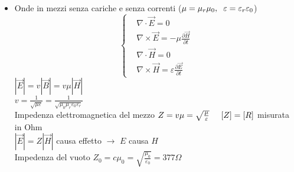 \documentclass[a4paper]{article}
\begin{document}
\begin{itemize}
\item Onde in mezzi senza cariche e senza correnti ($\mu=\mu_r \mu_0,\hspace{2mm} \varepsilon = \varepsilon_r \varepsilon_0$)
	\begin{equation*}
	\begin{cases}
		& \nabla \cdot \overrightarrow{E}=0\\
		& \nabla \times \overrightarrow{E}=-\mu\frac{\partial \overrightarrow{H}}{\partial t}\\
		& \nabla \cdot \overrightarrow{H} = 0\\
		& \nabla \times \overrightarrow{H} =\varepsilon\frac{\partial \overrightarrow{E}}{\partial t}
	\end{cases}
	\end{equation*} 
$|\overrightarrow{E}|=v|\overrightarrow{B}|=v \mu|\overrightarrow{H}|$\\
$v=\frac{1}{\sqrt{\mu \varepsilon}}=\frac{1}{\sqrt{\mu_0 \mu_r \varepsilon_0 \varepsilon_r}}$\\

Impedenza elettromagnetica del mezzo $Z=v \mu = \sqrt{\frac{\mu}{\varepsilon}}\hspace{5mm} [Z]=[R]$ misurata in Ohm\\
$|\overrightarrow{E}|=Z|\overrightarrow{H}|$ causa effetto $\rightarrow$ $E$ causa $H$\\
Impedenza del vuoto $Z_0=c\mu_0=\sqrt{\frac{\mu_0}{\varepsilon_0}}=377\Omega$


\end{itemize}
\end{document}
